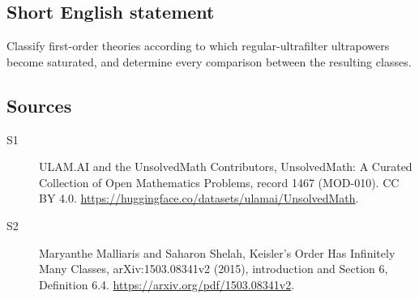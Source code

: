 \documentclass[11pt]{article}
\begin{document}
\subsection{Short English statement}
Classify first-order theories according to which regular-ultrafilter ultrapowers become saturated, and determine every comparison between the resulting classes.
\subsection{Sources}
\begin{description}
\item[\hypertarget{source:1467:1}{S1}] ULAM.AI and the UnsolvedMath Contributors, UnsolvedMath: A Curated Collection of Open Mathematics Problems, record 1467 (MOD-010). CC BY 4.0. \url{https://huggingface.co/datasets/ulamai/UnsolvedMath}.
\item[\hypertarget{source:1467:2}{S2}] Maryanthe Malliaris and Saharon Shelah, Keisler’s Order Has Infinitely Many Classes, arXiv:1503.08341v2 (2015), introduction and Section 6, Definition 6.4. \url{https://arxiv.org/pdf/1503.08341v2}.
\end{description}
\label{end:1467}
\end{document}

